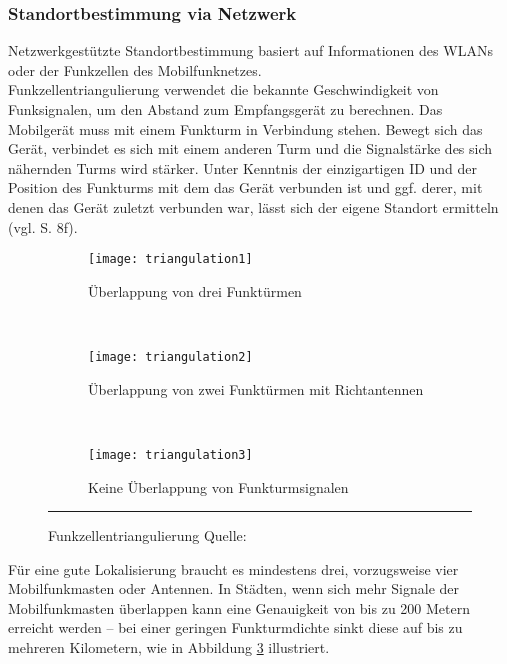 \subsubsection{Standortbestimmung via Netzwerk}
Netzwerkgestützte Standortbestimmung basiert auf Informationen des \glspl{WLAN} oder der Funkzellen des Mobilfunknetzes.\\ 
Funkzellentriangulierung verwendet die bekannte Geschwindigkeit von Funksignalen, um den Abstand zum Empfangsgerät zu berechnen. Das Mobilgerät muss mit einem Funkturm in Verbindung stehen. Bewegt sich das Gerät, verbindet es sich mit einem anderen Turm und die Signalstärke des sich nähernden Turms wird stärker. Unter Kenntnis der einzigartigen ID und der Position des Funkturms mit dem das Gerät verbunden ist und ggf. derer, mit denen das Gerät zuletzt verbunden war, lässt sich der eigene Standort ermitteln (vgl. \cite{location} S. 8f). \\
\begin{figure}[H]
        \centering
        \begin{subfigure}[t]{0.23\textwidth}
                \texttt{[image: triangulation1]}
                \caption{Überlappung von drei Funktürmen}
                \label{fig:cell1}
        \end{subfigure}
        ~ 
        \begin{subfigure}[t]{0.23\textwidth}
                \texttt{[image: triangulation2]}
                \caption{Überlappung von zwei Funktürmen mit Richtantennen}
                \label{fig:cell2}
        \end{subfigure}
         ~ 
        \begin{subfigure}[t]{0.23\textwidth}
                \texttt{[image: triangulation3]}
                \caption{Keine Überlappung von Funkturmsignalen}
                \label{fig:cell3}
        \end{subfigure}
        \rule{35em}{0.5pt}
        \caption[Funkzellentriangulierung]{Funkzellentriangulierung Quelle: \cite{fig:cell}}
        \label{fig:cell}
\end{figure}
Für eine gute Lokalisierung braucht es mindestens drei, vorzugsweise vier Mobilfunkmasten oder Antennen. In Städten, wenn sich mehr Signale der Mobilfunkmasten überlappen kann eine Genauigkeit von bis zu 200 Metern erreicht werden -- bei einer geringen Funkturmdichte sinkt diese auf bis zu mehreren Kilometern, wie in Abbildung \ref{fig:cell3} illustriert. \\
